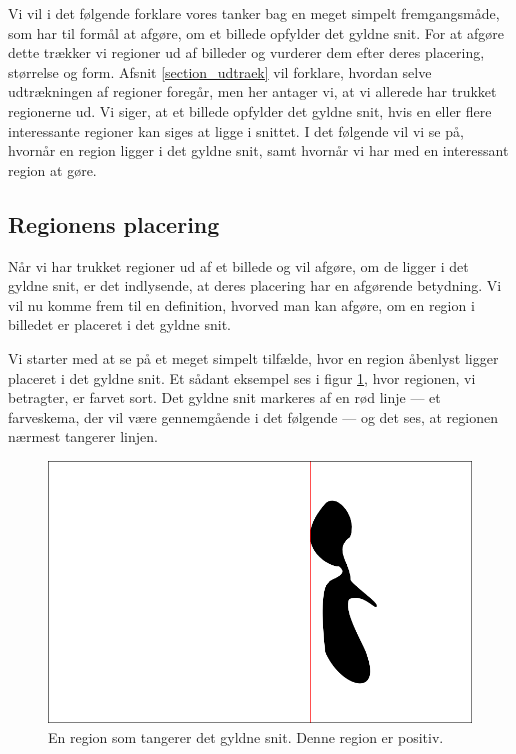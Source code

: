 {
\def\imgscale{0.34}

\textsf{Vi vil i det følgende forklare vores tanker bag en meget simpelt
fremgangsmåde, som har til formål at afgøre, om et billede opfylder det
gyldne snit. For at afgøre dette trækker vi regioner ud af billeder og
vurderer dem efter deres placering, størrelse og form. Afsnit
\ref{section_udtraek} vil forklare, hvordan selve udtrækningen af
regioner foregår, men her antager vi, at vi allerede har trukket
regionerne ud. Vi siger, at et billede opfylder det gyldne snit, hvis en
eller flere interessante regioner kan siges at ligge i snittet.  I det
følgende vil vi se på, hvornår en region ligger i det gyldne snit, samt
hvornår vi har med en interessant region at gøre.
}

\subsection{Regionens placering}
Når vi har trukket regioner ud af et billede og vil afgøre, om de ligger
i det gyldne snit, er det indlysende, at deres placering har en afgørende
betydning.  Vi vil nu komme frem til en definition, hvorved man kan
afgøre, om en region i billedet er placeret i det gyldne snit.

Vi starter med at se på et meget simpelt tilfælde, hvor en region
åbenlyst ligger placeret i det gyldne snit.  Et sådant eksempel ses i
figur \ref{pos_naiv_1}, hvor regionen, vi betragter, er farvet sort.
Det gyldne snit markeres af en rød linje --- et farveskema, der vil være
gennemgående i det følgende --- og det ses, at regionen nærmest tangerer
linjen.

\begin{figure}[h]
    \begin{center}
        \includegraphics[scale=\imgscale,angle=0]{afsnit/vores_implementation/billeder/naiv_algoritme/naiv_positiv_blob_1}
    \end{center}
    \caption[En positiv region]{En region som tangerer det gyldne snit.
    Denne region er positiv.}
    \label{pos_naiv_1}
\end{figure}

}
